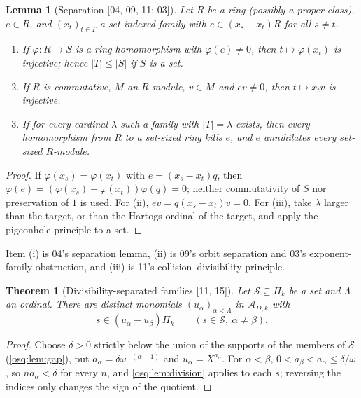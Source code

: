 \documentclass[11pt,letterpaper]{article}
\numberwithin{equation}{section}
\newtheorem{theorem}{Theorem}[section]
\newtheorem{lemma}[lemma]{Lemma}
\theoremstyle{definition}
\theoremstyle{remark}
\theoremstyle{plain}
\newcommand{\A}{\mathcal A}          %
\newcommand{\src}[1]{\textup{\textsf{[#1]}}}
\begin{document}
\begin{lemma}[Separation \src{04, 09, 11; 03}]\label{osq:lem:separation}
Let $R$ be a ring (possibly a proper class), $e\in R$, and $(x_t)_{t\in T}$ a set-indexed
family with $e\in(x_s-x_t)R$ for all $s\ne t$.
\begin{enumerate}
\item If $\varphi:R\to S$ is a ring homomorphism with $\varphi(e)\ne0$, then
$t\mapsto\varphi(x_t)$ is injective; hence $|T|\le|S|$ if $S$ is a set.
\item If $R$ is commutative, $M$ an $R$-module, $v\in M$ and $ev\ne0$, then
$t\mapsto x_tv$ is injective.
\item If for every cardinal $\lambda$ such a family with $|T|=\lambda$ exists, then every
homomorphism from $R$ to a set-sized ring kills $e$, and $e$ annihilates every set-sized
$R$-module.
\end{enumerate}
\end{lemma}
\begin{proof}
If $\varphi(x_s)=\varphi(x_t)$ with $e=(x_s-x_t)q$, then
$\varphi(e)=(\varphi(x_s)-\varphi(x_t))\varphi(q)=0$; neither commutativity of $S$ nor
preservation of $1$ is used. For (ii), $ev=q(x_s-x_t)v=0$. For (iii), take $\lambda$
larger than the target, or than the Hartogs ordinal of the target, and apply the
pigeonhole principle to a set.
\end{proof}

Item (i) is 04's separation lemma, (ii) is 09's orbit separation and 03's exponent-family
obstruction, and (iii) is 11's collision--divisibility principle.

\begin{theorem}[Divisibility-separated families \src{11, 15}]\label{osq:thm:packing}
Let $\mathcal S\subseteq\Pi_k$ be a set and $\Lambda$ an ordinal. There are distinct
monomials $(u_\alpha)_{\alpha<\Lambda}$ in $\A_{D,k}$ with
\[
 s\in(u_\alpha-u_\beta)\Pi_k\qquad(s\in\mathcal S,\ \alpha\ne\beta).
\]
\end{theorem}
\begin{proof}
Choose $\delta>0$ strictly below the union of the supports of the members of
$\mathcal S$ (\cref{osq:lem:gap}), put $a_\alpha=\delta\omega^{-(\alpha+1)}$ and
$u_\alpha=X^{a_\alpha}$. For $\alpha<\beta$, $0<a_\beta<a_\alpha\le\delta/\omega$, so
$na_\alpha<\delta$ for every $n$, and \cref{osq:lem:division} applies to each $s$;
reversing the indices only changes the sign of the quotient.
\end{proof}
\end{document}
